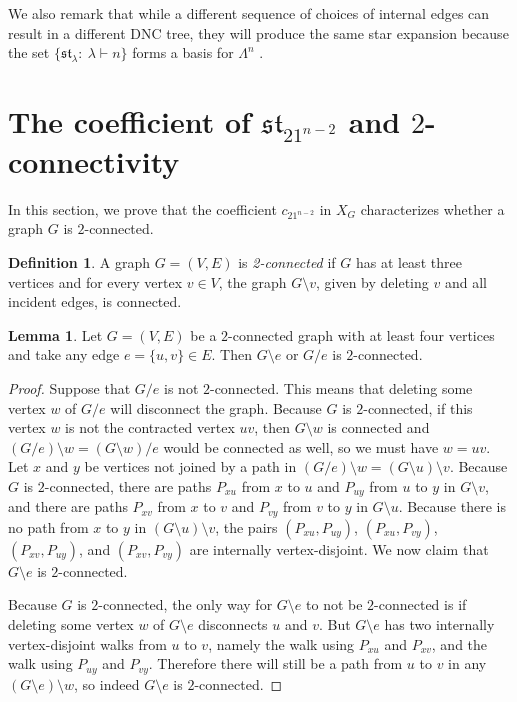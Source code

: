\documentclass[12pt]{amsart}  %
\theoremstyle{definition}
\newtheorem{lemma}[theorem]{Lemma}
\newtheorem{definition}[theorem]{Definition}
\theoremstyle{remark}
\numberwithin{equation}{section}
\begin{document}
We also remark that while a different sequence of choices of internal edges can result in a different DNC tree, they will produce the same star expansion because the set $\{\mathfrak{st}_\lambda: \ \lambda\vdash n\}$ forms a basis for $\Lambda^n$ \cite[Theorem 5]{chrombases}.  

\section{The coefficient of $\mathfrak{st}_{21^{n-2}}$ and $2$-connectivity}\label{sec:2con}

In this section, we prove that the coefficient $c_{21^{n-2}}$ in $X_G$ characterizes whether a graph $G$ is $2$-connected.

\begin{definition}
A graph $G=(V,E)$ is \emph{2-connected} if $G$ has at least three vertices and for every vertex $v\in V$, the graph $G\setminus v$, given by deleting $v$ and all incident edges, is connected.
\end{definition}


\begin{lemma}\label{lem:2con}
Let $G=(V,E)$ be a $2$-connected graph with at least four vertices and take any edge $e=\{u,v\}\in E$. Then $G\setminus e$ or $G/e$ is $2$-connected. 
\end{lemma}

\begin{proof}
Suppose that $G/e$ is not $2$-connected. This means that deleting some vertex $w$ of $G/e$ will disconnect the graph. Because $G$ is $2$-connected, if this vertex $w$ is not the contracted vertex $uv$, then $G\setminus w$ is connected and $(G/e)\setminus w=(G\setminus w)/e$ would be connected as well, so we must have $w=uv$. Let $x$ and $y$ be vertices not joined by a path in $(G/e)\setminus w=(G\setminus u)\setminus v$. Because $G$ is $2$-connected, there are paths $P_{xu}$ from $x$ to $u$ and $P_{uy}$ from $u$ to $y$ in $G\setminus v$, and there are paths $P_{xv}$ from $x$ to $v$ and $P_{vy}$ from $v$ to $y$ in $G\setminus u$. Because there is no path from $x$ to $y$ in $(G\setminus u)\setminus v$, the pairs $(P_{xu},P_{uy})$, $(P_{xu},P_{vy})$, $(P_{xv},P_{uy})$, and $(P_{xv},P_{vy})$ are internally vertex-disjoint. We now claim that $G\setminus e$ is $2$-connected.

Because $G$ is $2$-connected, the only way for $G\setminus e$ to not be $2$-connected is if deleting some vertex $w$ of $G\setminus e$ disconnects $u$ and $v$. But $G\setminus e$ has two internally vertex-disjoint walks from $u$ to $v$, namely the walk using $P_{xu}$ and $P_{xv}$, and the walk using $P_{uy}$ and $P_{vy}$. Therefore there will still be a path from $u$ to $v$ in any $(G\setminus e)\setminus w$, so indeed $G\setminus e$ is $2$-connected.
\end{proof}
\end{document}
